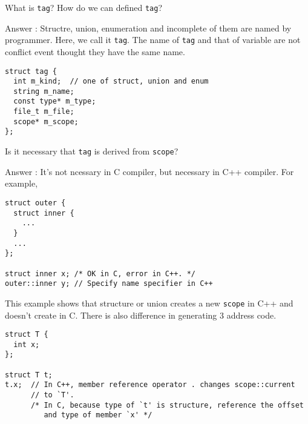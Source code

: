 \begin{QandA}
\label{symtab_e001}
What is {\tt{tag}}? How do we can defined {\tt{tag}}?

Answer : Structre, union, enumeration and incomplete of them
are named by programmer. Here, we call it {\tt{tag}}.
The name of {\tt{tag}} and that of variable are not conflict
event thought they have the same name.

\begin{verbatim}
struct tag {
  int m_kind;  // one of struct, union and enum
  string m_name;
  const type* m_type;
  file_t m_file;
  scope* m_scope;
};
\end{verbatim}
\end{QandA}

\begin{QandA}
Is it necessary that {\tt{tag}} is derived from {\tt{scope}}?

Answer : It's not ncessary in C compiler, but
necessary in C++ compiler. For example,
\begin{verbatim}
struct outer {
  struct inner {
    ...
  }
  ...
};

struct inner x; /* OK in C, error in C++. */
outer::inner y; // Specify name specifier in C++
\end{verbatim}
This example shows that structure or union creates
a new {\tt{scope}} in C++ and doesn't create in C.
There is also difference in generating 3 address code.
\begin{verbatim}
struct T {
  int x;
};

struct T t;
t.x;  // In C++, member reference operator . changes scope::current
      // to `T'.
      /* In C, because type of `t' is structure, reference the offset
         and type of member `x' */
\end{verbatim}
\end{QandA}

